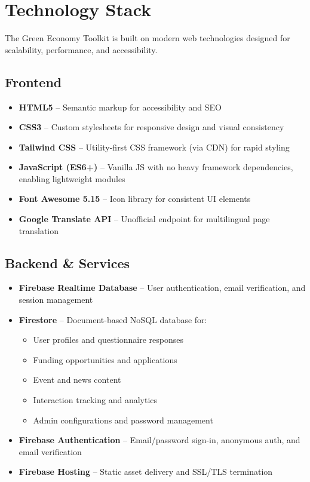 \documentclass[a4paper,12pt]{article}
\begin{document}


\section{Technology Stack}
The Green Economy Toolkit is built on modern web technologies designed for scalability, performance, and accessibility.

\subsection{Frontend}
\begin{itemize}
    \item \textbf{HTML5} – Semantic markup for accessibility and SEO
    \item \textbf{CSS3} – Custom stylesheets for responsive design and visual consistency
    \item \textbf{Tailwind CSS} – Utility-first CSS framework (via CDN) for rapid styling
    \item \textbf{JavaScript (ES6+)} – Vanilla JS with no heavy framework dependencies, enabling lightweight modules
    \item \textbf{Font Awesome 5.15} – Icon library for consistent UI elements
    \item \textbf{Google Translate API} – Unofficial endpoint for multilingual page translation
\end{itemize}

\subsection{Backend \& Services}
\begin{itemize}
    \item \textbf{Firebase Realtime Database} – User authentication, email verification, and session management
    \item \textbf{Firestore} – Document-based NoSQL database for:
    \begin{itemize}
        \item User profiles and questionnaire responses
        \item Funding opportunities and applications
        \item Event and news content
        \item Interaction tracking and analytics
        \item Admin configurations and password management
    \end{itemize}
    \item \textbf{Firebase Authentication} – Email/password sign-in, anonymous auth, and email verification
    \item \textbf{Firebase Hosting} – Static asset delivery and SSL/TLS termination
\end{itemize}
\end{document}
